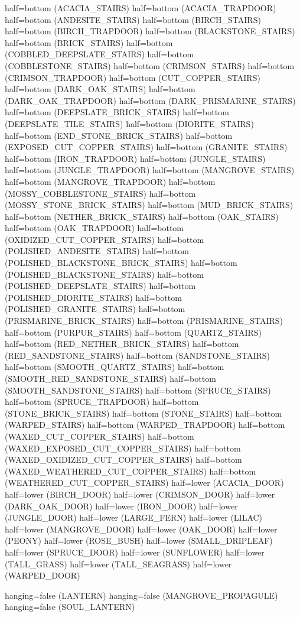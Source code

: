 \documentclass[11pt]{article}
\begin{document}
half=bottom (ACACIA_STAIRS)
half=bottom (ACACIA_TRAPDOOR)
half=bottom (ANDESITE_STAIRS)
half=bottom (BIRCH_STAIRS)
half=bottom (BIRCH_TRAPDOOR)
half=bottom (BLACKSTONE_STAIRS)
half=bottom (BRICK_STAIRS)
half=bottom (COBBLED_DEEPSLATE_STAIRS)
half=bottom (COBBLESTONE_STAIRS)
half=bottom (CRIMSON_STAIRS)
half=bottom (CRIMSON_TRAPDOOR)
half=bottom (CUT_COPPER_STAIRS)
half=bottom (DARK_OAK_STAIRS)
half=bottom (DARK_OAK_TRAPDOOR)
half=bottom (DARK_PRISMARINE_STAIRS)
half=bottom (DEEPSLATE_BRICK_STAIRS)
half=bottom (DEEPSLATE_TILE_STAIRS)
half=bottom (DIORITE_STAIRS)
half=bottom (END_STONE_BRICK_STAIRS)
half=bottom (EXPOSED_CUT_COPPER_STAIRS)
half=bottom (GRANITE_STAIRS)
half=bottom (IRON_TRAPDOOR)
half=bottom (JUNGLE_STAIRS)
half=bottom (JUNGLE_TRAPDOOR)
half=bottom (MANGROVE_STAIRS)
half=bottom (MANGROVE_TRAPDOOR)
half=bottom (MOSSY_COBBLESTONE_STAIRS)
half=bottom (MOSSY_STONE_BRICK_STAIRS)
half=bottom (MUD_BRICK_STAIRS)
half=bottom (NETHER_BRICK_STAIRS)
half=bottom (OAK_STAIRS)
half=bottom (OAK_TRAPDOOR)
half=bottom (OXIDIZED_CUT_COPPER_STAIRS)
half=bottom (POLISHED_ANDESITE_STAIRS)
half=bottom (POLISHED_BLACKSTONE_BRICK_STAIRS)
half=bottom (POLISHED_BLACKSTONE_STAIRS)
half=bottom (POLISHED_DEEPSLATE_STAIRS)
half=bottom (POLISHED_DIORITE_STAIRS)
half=bottom (POLISHED_GRANITE_STAIRS)
half=bottom (PRISMARINE_BRICK_STAIRS)
half=bottom (PRISMARINE_STAIRS)
half=bottom (PURPUR_STAIRS)
half=bottom (QUARTZ_STAIRS)
half=bottom (RED_NETHER_BRICK_STAIRS)
half=bottom (RED_SANDSTONE_STAIRS)
half=bottom (SANDSTONE_STAIRS)
half=bottom (SMOOTH_QUARTZ_STAIRS)
half=bottom (SMOOTH_RED_SANDSTONE_STAIRS)
half=bottom (SMOOTH_SANDSTONE_STAIRS)
half=bottom (SPRUCE_STAIRS)
half=bottom (SPRUCE_TRAPDOOR)
half=bottom (STONE_BRICK_STAIRS)
half=bottom (STONE_STAIRS)
half=bottom (WARPED_STAIRS)
half=bottom (WARPED_TRAPDOOR)
half=bottom (WAXED_CUT_COPPER_STAIRS)
half=bottom (WAXED_EXPOSED_CUT_COPPER_STAIRS)
half=bottom (WAXED_OXIDIZED_CUT_COPPER_STAIRS)
half=bottom (WAXED_WEATHERED_CUT_COPPER_STAIRS)
half=bottom (WEATHERED_CUT_COPPER_STAIRS)
half=lower (ACACIA_DOOR)
half=lower (BIRCH_DOOR)
half=lower (CRIMSON_DOOR)
half=lower (DARK_OAK_DOOR)
half=lower (IRON_DOOR)
half=lower (JUNGLE_DOOR)
half=lower (LARGE_FERN)
half=lower (LILAC)
half=lower (MANGROVE_DOOR)
half=lower (OAK_DOOR)
half=lower (PEONY)
half=lower (ROSE_BUSH)
half=lower (SMALL_DRIPLEAF)
half=lower (SPRUCE_DOOR)
half=lower (SUNFLOWER)
half=lower (TALL_GRASS)
half=lower (TALL_SEAGRASS)
half=lower (WARPED_DOOR)

hanging=false (LANTERN)
hanging=false (MANGROVE_PROPAGULE)
hanging=false (SOUL_LANTERN)
\end{document}
